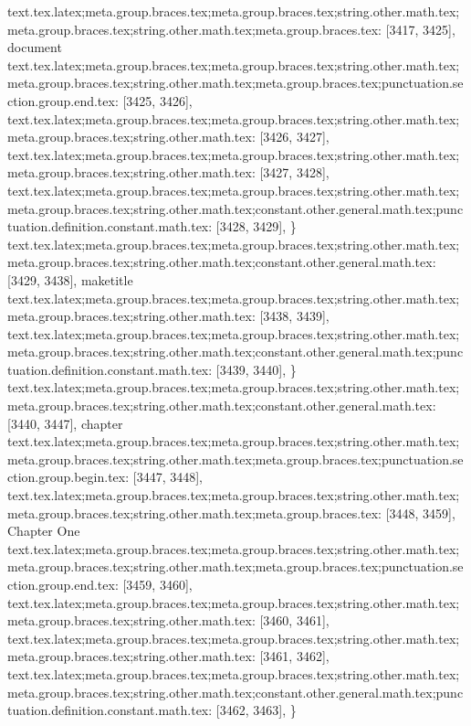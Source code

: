 {{{{{{{{{{{{{{{{{{{{{{{{{{{{{{{{{{{{{{{{{{{{{{{{{{{{{{{{{{{{{{{{{{{{{{{{{{{{{{{{{{{{{{{{{{{{{{{{{{{{{{{text.tex.latex;meta.group.braces.tex;meta.group.braces.tex;string.other.math.tex;meta.group.braces.tex;string.other.math.tex;meta.group.braces.tex: [3417, 3425], {document}
text.tex.latex;meta.group.braces.tex;meta.group.braces.tex;string.other.math.tex;meta.group.braces.tex;string.other.math.tex;meta.group.braces.tex;punctuation.section.group.end.tex: [3425, 3426], {}}
text.tex.latex;meta.group.braces.tex;meta.group.braces.tex;string.other.math.tex;meta.group.braces.tex;string.other.math.tex: [3426, 3427], {
}
text.tex.latex;meta.group.braces.tex;meta.group.braces.tex;string.other.math.tex;meta.group.braces.tex;string.other.math.tex: [3427, 3428], {
}
text.tex.latex;meta.group.braces.tex;meta.group.braces.tex;string.other.math.tex;meta.group.braces.tex;string.other.math.tex;constant.other.general.math.tex;punctuation.definition.constant.math.tex: [3428, 3429], {\}
text.tex.latex;meta.group.braces.tex;meta.group.braces.tex;string.other.math.tex;meta.group.braces.tex;string.other.math.tex;constant.other.general.math.tex: [3429, 3438], {maketitle}
text.tex.latex;meta.group.braces.tex;meta.group.braces.tex;string.other.math.tex;meta.group.braces.tex;string.other.math.tex: [3438, 3439], {
}
text.tex.latex;meta.group.braces.tex;meta.group.braces.tex;string.other.math.tex;meta.group.braces.tex;string.other.math.tex;constant.other.general.math.tex;punctuation.definition.constant.math.tex: [3439, 3440], {\}
text.tex.latex;meta.group.braces.tex;meta.group.braces.tex;string.other.math.tex;meta.group.braces.tex;string.other.math.tex;constant.other.general.math.tex: [3440, 3447], {chapter}
text.tex.latex;meta.group.braces.tex;meta.group.braces.tex;string.other.math.tex;meta.group.braces.tex;string.other.math.tex;meta.group.braces.tex;punctuation.section.group.begin.tex: [3447, 3448], {{}
text.tex.latex;meta.group.braces.tex;meta.group.braces.tex;string.other.math.tex;meta.group.braces.tex;string.other.math.tex;meta.group.braces.tex: [3448, 3459], {Chapter One}
text.tex.latex;meta.group.braces.tex;meta.group.braces.tex;string.other.math.tex;meta.group.braces.tex;string.other.math.tex;meta.group.braces.tex;punctuation.section.group.end.tex: [3459, 3460], {}}
text.tex.latex;meta.group.braces.tex;meta.group.braces.tex;string.other.math.tex;meta.group.braces.tex;string.other.math.tex: [3460, 3461], {
}
text.tex.latex;meta.group.braces.tex;meta.group.braces.tex;string.other.math.tex;meta.group.braces.tex;string.other.math.tex: [3461, 3462], {
}
text.tex.latex;meta.group.braces.tex;meta.group.braces.tex;string.other.math.tex;meta.group.braces.tex;string.other.math.tex;constant.other.general.math.tex;punctuation.definition.constant.math.tex: [3462, 3463], {\}
}}}}}}}}}}}}}}}}}}}}}}}}}}}}}}}}}}}}}}}}}}}}}}}}}}}}}}}}}}}}}}}}}}}}}}}}}}}}}}}}}}}}}}}}}}}}}}}}}}}}}}}}}
